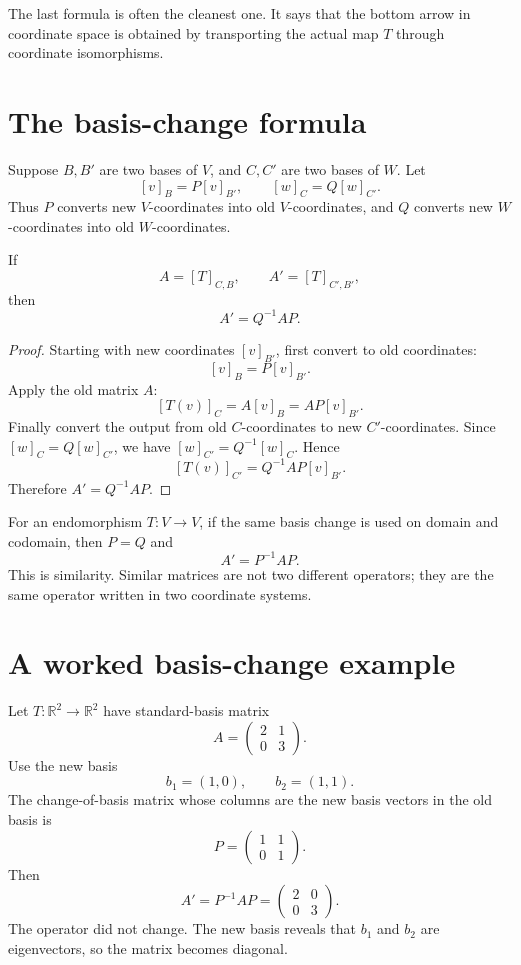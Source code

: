 The last formula is often the cleanest one.  It says that the bottom arrow in coordinate space is obtained by transporting the actual map \(T\) through coordinate isomorphisms.

\section{The basis-change formula}

Suppose \(B,B'\) are two bases of \(V\), and \(C,C'\) are two bases of \(W\).  Let
\[
  [v]_B=P[v]_{B'},\qquad [w]_C=Q[w]_{C'}.
\]
Thus \(P\) converts new \(V\)-coordinates into old \(V\)-coordinates, and \(Q\) converts new \(W\)-coordinates into old \(W\)-coordinates.

\begin{proposition}
If
\[
  A=[T]_{C,B},\qquad A'=[T]_{C',B'},
\]
then
\[
  A'=Q^{-1}AP.
\]
\end{proposition}

\begin{proof}
Starting with new coordinates \([v]_{B'}\), first convert to old coordinates:
\[
  [v]_B=P[v]_{B'}.
\]
Apply the old matrix \(A\):
\[
  [T(v)]_C=A[v]_B=AP[v]_{B'}.
\]
Finally convert the output from old \(C\)-coordinates to new \(C'\)-coordinates.  Since \([w]_C=Q[w]_{C'}\), we have \([w]_{C'}=Q^{-1}[w]_C\).  Hence
\[
  [T(v)]_{C'}=Q^{-1}AP[v]_{B'}.
\]
Therefore \(A'=Q^{-1}AP\).
\end{proof}

For an endomorphism \(T:V\to V\), if the same basis change is used on domain and codomain, then \(P=Q\) and
\[
  A'=P^{-1}AP.
\]
This is similarity.  Similar matrices are not two different operators; they are the same operator written in two coordinate systems.

\section{A worked basis-change example}

Let \(T:\mathbb R^2\to\mathbb R^2\) have standard-basis matrix
\[
  A=
  \begin{pmatrix}
  2&1\\
  0&3
  \end{pmatrix}.
\]
Use the new basis
\[
  b_1=(1,0),\qquad b_2=(1,1).
\]
The change-of-basis matrix whose columns are the new basis vectors in the old basis is
\[
  P=
  \begin{pmatrix}
  1&1\\
  0&1
  \end{pmatrix}.
\]
Then
\[
  A'=P^{-1}AP
  =
  \begin{pmatrix}
  2&0\\
  0&3
  \end{pmatrix}.
\]
The operator did not change.  The new basis reveals that \(b_1\) and \(b_2\) are eigenvectors, so the matrix becomes diagonal.

